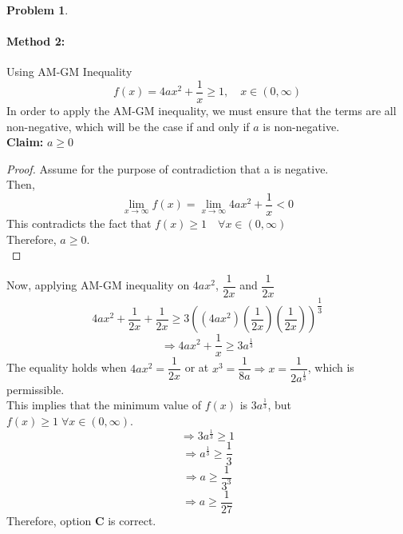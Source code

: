 \documentclass[14]{article}
\theoremstyle{definition}
\newtheorem{prob}{Problem}
\theoremstyle{case}
\begin{document}
\begin{prob}
\paragraph{Method 2:} Using AM-GM Inequality
\[f(x) = 4ax^2 + \dfrac1{x} \geq 1, \quad x \in (0, \infty)\]
In order to apply the AM-GM inequality, we must ensure that the terms are all non-negative, which will be the case if and only if $a$ is non-negative.\\
\textbf{Claim:} $a \geq 0$
\begin{proof}
Assume for the purpose of contradiction that a is negative.\\
Then,
\[\lim\limits_{x \to \infty} f(x) = \lim\limits_{x \to \infty} 4ax^2 + \dfrac1{x} < 0\]
This contradicts the fact that $f(x) \geq 1 \quad \forall x \in (0, \infty)$\\
Therefore, $a \geq 0$.\\
\end{proof}
Now, applying AM-GM inequality on $4ax^2$, $\dfrac1{2x}$ and $\dfrac1{2x}$
\[4ax^2 + \dfrac1{2x} + \dfrac1{2x} \geq 3 \left( (4ax^2)\left(\dfrac1{2x}\right)\left(\dfrac1{2x}\right) \right)^{\dfrac13}\]
\[\Rightarrow 4ax^2 + \dfrac1{x} \geq 3a^{\frac13}\]
The equality holds when $4ax^2 = \dfrac1{2x}$ or at $x^3 = \dfrac1{8a} \Rightarrow x = \dfrac1{2a^{\frac13}}$, which is permissible.\\
This implies that the minimum value of $f(x)$ is $3a^{\frac13}$, but $f(x) \geq 1 \; \forall x \in (0, \infty)$.\\
\[\Rightarrow 3a^{\frac13} \geq 1\]
\[\Rightarrow a^{\frac13} \geq \dfrac13\]
\[\Rightarrow a \geq \dfrac1{3^3}\]
\[\Rightarrow a \geq \dfrac1{27}\]
Therefore, option \textbf{C} is correct.
\end{prob}
\pagebreak
\end{document}
